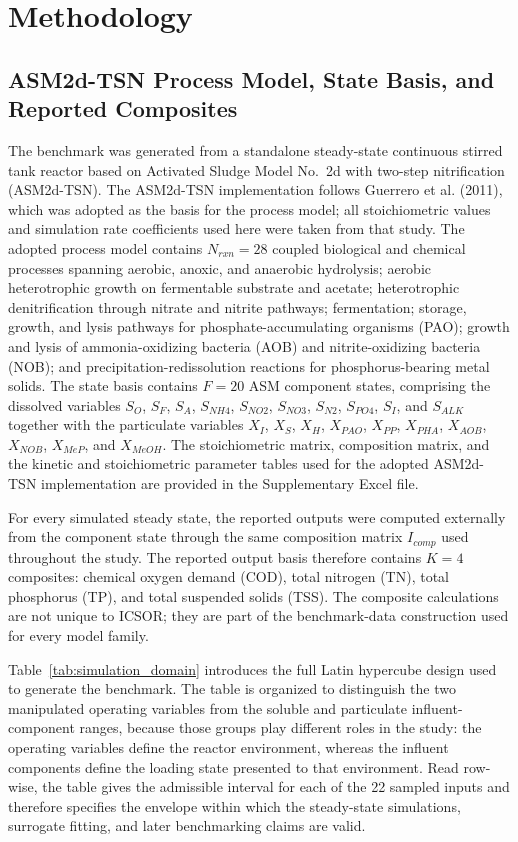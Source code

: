 \documentclass[a4paper,fleqn]{cas-sc}
\newcommand{\rev}[1]{#1}
\newenvironment{revblock}{}{}
\begin{document}
\section{\rev{Methodology}}
\begin{revblock}

\subsection{ASM2d-TSN Process Model, State Basis, and Reported Composites}

The benchmark was generated from a standalone steady-state continuous stirred tank reactor based on Activated Sludge Model No.\ 2d with two-step nitrification (ASM2d-TSN). The ASM2d-TSN implementation follows Guerrero et al. (2011), which was adopted as the basis for the process model; all stoichiometric values and simulation rate coefficients used here were taken from that study. The adopted process model contains $N_{rxn}=28$ coupled biological and chemical processes spanning aerobic, anoxic, and anaerobic hydrolysis; aerobic heterotrophic growth on fermentable substrate and acetate; heterotrophic denitrification through nitrate and nitrite pathways; fermentation; storage, growth, and lysis pathways for phosphate-accumulating organisms (PAO); growth and lysis of ammonia-oxidizing bacteria (AOB) and nitrite-oxidizing bacteria (NOB); and precipitation-redissolution reactions for phosphorus-bearing metal solids. The state basis contains $F=20$ ASM component states, comprising the dissolved variables $S_O$, $S_F$, $S_A$, $S_{NH4}$, $S_{NO2}$, $S_{NO3}$, $S_{N2}$, $S_{PO4}$, $S_I$, and $S_{ALK}$ together with the particulate variables $X_I$, $X_S$, $X_H$, $X_{PAO}$, $X_{PP}$, $X_{PHA}$, $X_{AOB}$, $X_{NOB}$, $X_{MeP}$, and $X_{MeOH}$. The stoichiometric matrix, composition matrix, and the kinetic and stoichiometric parameter tables used for the adopted ASM2d-TSN implementation are provided in the Supplementary Excel file.

For every simulated steady state, the reported outputs were computed externally from the component state through the same composition matrix $I_{comp}$ used throughout the study. The reported output basis therefore contains $K=4$ composites: chemical oxygen demand (COD), total nitrogen (TN), total phosphorus (TP), and total suspended solids (TSS). The composite calculations are not unique to ICSOR; they are part of the benchmark-data construction used for every model family.

Table~\ref{tab:simulation_domain} introduces the full Latin hypercube design used to generate the benchmark. The table is organized to distinguish the two manipulated operating variables from the soluble and particulate influent-component ranges, because those groups play different roles in the study: the operating variables define the reactor environment, whereas the influent components define the loading state presented to that environment. Read row-wise, the table gives the admissible interval for each of the 22 sampled inputs and therefore specifies the envelope within which the steady-state simulations, surrogate fitting, and later benchmarking claims are valid.


\end{revblock}
\end{document}
